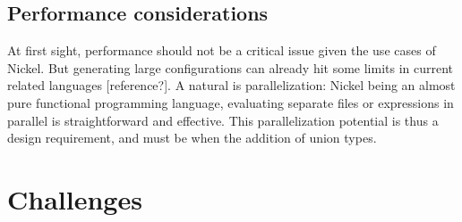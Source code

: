 
\subsection{Performance considerations}

At first sight, performance should not be a critical issue given the use cases
of Nickel. But generating large configurations can already hit some limits in
current related languages [reference?]. A natural is parallelization:
Nickel being an almost pure functional programming language, evaluating separate
files or expressions in parallel is straightforward and effective. This
parallelization potential is thus a design requirement, and must be when the
addition of union types.

\section{Challenges}




